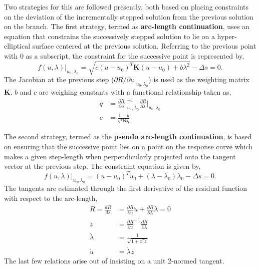 \documentclass[10pt]{article}
\begin{document}
Two strategies for this are followed presently, both based on placing
constraints on the deviation of the incrementally stepped solution
from the previous solution on the branch. The first strategy, termed
as \textbf{arc-length continuation}, uses an equation that constrains
the successively stepped solution to lie on a hyper-elliptical surface
centered at the previous solution. Referring to the previous point
with $0$ as a subscript, the constraint for the successive point is
represented by,
\begin{equation}
  f(u, \lambda)\rvert_{u_0, \lambda_0} =
    \sqrt{c{(u-u_0)}^T\mathbf{K}{(u-u_0)} + b\lambda^2} - \Delta s = 0.
  \label{eq:ALCNST}
\end{equation}
The Jacobian at the previous step ($\partial R/\partial u\rvert_{u_0,
  \lambda_0}$) is used as the weighting matrix $\mathbf{K}$. $b$ and
$c$ are weighing constants with a functional relationship taken as,
\begin{align*}
  q &= \frac{\partial R}{\partial u}\biggr\rvert_{u_0, \lambda_0}^{-1}
      \frac{\partial R}{\partial \lambda}\biggr\rvert_{u_0, \lambda_0}\\
  c &= \frac{1-b}{q^T\mathbf{K}q}
\end{align*}

The second strategy, termed as the \textbf{pseudo arc-length
  continuation}, is based on ensuring that the successive point lies
on a point on the response curve which makes a given step-length when
perpendicularly projected onto the tangent vector at the previous
step. The constraint equation is given by,
\begin{equation}
  f(u, \lambda)\rvert_{u_0, \lambda_0} =
  {(u-u_0)}^T\dot{u}_0 + (\lambda-\lambda_0)\dot{\lambda}_0 - \Delta s = 0.
  \label{eq:PALCNST}
\end{equation}
The tangents are estimated through the first derivative of the
residual function with respect to the arc-length,
\begin{align*}
  \dot{R} = \frac{dR}{ds} &= \frac{\partial R}{\partial u}\dot{u} +
                            \frac{\partial R}{\partial \lambda}
                            \dot{\lambda} = 0\\
  z &= {\frac{\partial R}{\partial u}}^{-1}
      \frac{\partial R}{\partial \lambda}\\
  \dot{\lambda} &= \frac{1}{\sqrt{1+z^Tz}}\\
  \dot{u} &= \dot{\lambda}z
\end{align*}
The last few relations arise out of insisting on a unit 2-normed
tangent.
\end{document}
